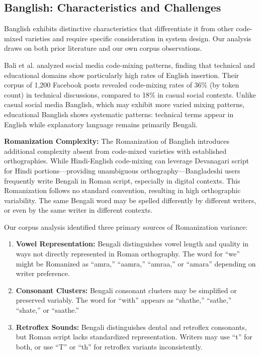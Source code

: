 \subsection{Banglish: Characteristics and Challenges}

Banglish exhibits distinctive characteristics that differentiate it from other code-mixed varieties and require specific consideration in system design. Our analysis draws on both prior literature and our own corpus observations.

Bali et al. \cite{Bali2014} analyzed social media code-mixing patterns, finding that technical and educational domains show particularly high rates of English insertion. Their corpus of 1,200 Facebook posts revealed code-mixing rates of 36\% (by token count) in technical discussions, compared to 18\% in casual social contexts. Unlike casual social media Banglish, which may exhibit more varied mixing patterns, educational Banglish shows systematic patterns: technical terms appear in English while explanatory language remains primarily Bengali.

\textbf{Romanization Complexity:} The Romanization of Banglish introduces additional complexity absent from code-mixed varieties with established orthographies. While Hindi-English code-mixing can leverage Devanagari script for Hindi portions---providing unambiguous orthography---Bangladeshi users frequently write Bengali in Roman script, especially in digital contexts. This Romanization follows no standard convention, resulting in high orthographic variability. The same Bengali word may be spelled differently by different writers, or even by the same writer in different contexts.

Our corpus analysis identified three primary sources of Romanization variance:
\begin{enumerate}
    \item \textbf{Vowel Representation:} Bengali distinguishes vowel length and quality in ways not directly represented in Roman orthography. The word for ``we'' might be Romanized as ``amra,'' ``aamra,'' ``amraa,'' or ``amara'' depending on writer preference.
    
    \item \textbf{Consonant Clusters:} Bengali consonant clusters may be simplified or preserved variably. The word for ``with'' appears as ``shathe,'' ``sathe,'' ``shate,'' or ``saathe.''
    
    \item \textbf{Retroflex Sounds:} Bengali distinguishes dental and retroflex consonants, but Roman script lacks standardized representation. Writers may use ``t'' for both, or use ``T'' or ``th'' for retroflex variants inconsistently.
\end{enumerate}

